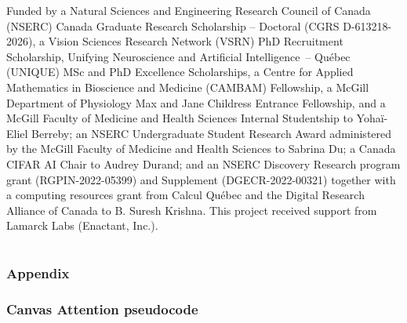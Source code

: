 \documentclass{article}
\begin{document}
\begin{ack}
Funded by a Natural Sciences and Engineering Research Council of Canada (NSERC) Canada Graduate Research Scholarship -- Doctoral (CGRS D-613218-2026), a Vision Sciences Research Network (VSRN) PhD Recruitment Scholarship, Unifying Neuroscience and Artificial Intelligence~-- Québec (UNIQUE) MSc and PhD Excellence Scholarships, a Centre for Applied Mathematics in Bioscience and Medicine (CAMBAM) Fellowship, a McGill Department of Physiology Max and Jane Childress Entrance Fellowship, and a McGill Faculty of Medicine and Health Sciences Internal Studentship to Yohaï-Eliel Berreby; an NSERC Undergraduate Student Research Award administered by the McGill Faculty of Medicine and Health Sciences to Sabrina Du; a Canada CIFAR AI Chair to Audrey Durand; and an NSERC Discovery Research program grant (RGPIN-2022-05399) and Supplement (DGECR-2022-00321) together with a computing resources grant from Calcul Québec and the Digital Research Alliance of Canada to B. Suresh Krishna. This project received support from Lamarck Labs (Enactant, Inc.).

\end{ack}






\appendix

\clearpage
\part[Appendix]{}
\section*{\centering \LARGE Appendix}
\parttoc
\clearpage

\section{Canvas Attention pseudocode}
\label{supp:canvas-attention-pseudocode}
\end{document}
